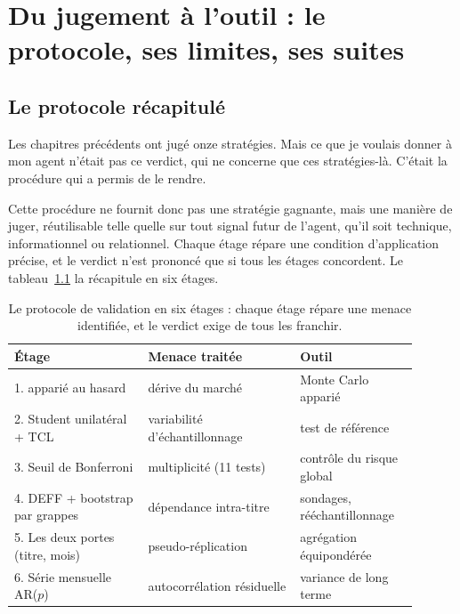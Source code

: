 \chapter{Du jugement à l'outil : le protocole, ses limites, ses suites}
\label{chap:protocole}

\section{Le protocole récapitulé}
\label{sec:protocole}

Les chapitres précédents ont jugé onze stratégies. Mais ce que je voulais
donner à mon agent n'était pas ce verdict, qui ne concerne que ces
stratégies-là. C'était la procédure qui a permis de le rendre.

Cette procédure ne fournit donc pas une stratégie gagnante, mais une manière
de juger, réutilisable telle quelle sur tout signal futur de l'agent, qu'il
soit technique, informationnel ou relationnel. Chaque étage répare une
condition d'application précise, et le verdict n'est prononcé que si tous les
étages concordent. Le tableau~\ref{tab:protocole} la récapitule en six étages.

\begin{table}[H]
\centering
\caption{Le protocole de validation en six étages : chaque étage répare
une menace identifiée, et le verdict exige de tous les franchir.}
\label{tab:protocole}
\small
\begin{tabular}{@{}p{0.30\linewidth}p{0.34\linewidth}p{0.26\linewidth}@{}}
\toprule
Étage & Menace traitée & Outil \\
\midrule
1. \edgevar{} apparié au hasard & dérive du marché & Monte Carlo apparié \\
2. Student unilatéral + TCL & variabilité d'échantillonnage & test de référence \\
3. Seuil de Bonferroni & multiplicité (11 tests) & contrôle du risque global \\
4. DEFF + bootstrap par grappes & dépendance intra-titre & sondages, rééchantillonnage \\
5. Les deux portes (titre, mois) & pseudo-réplication & agrégation équipondérée \\
6. Série mensuelle AR($p$) & autocorrélation résiduelle & variance de long terme \\
\bottomrule
\end{tabular}
\end{table}


